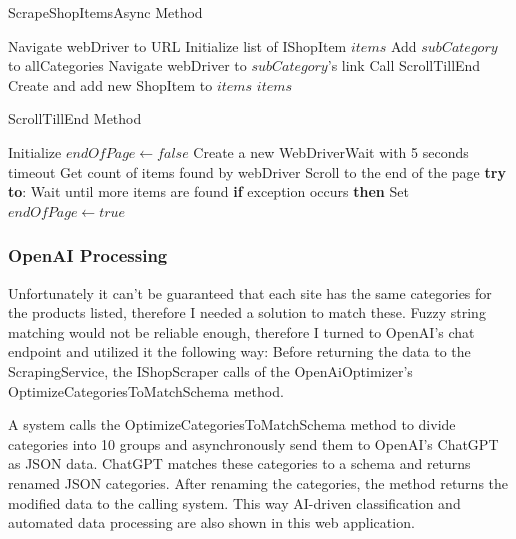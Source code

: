 \begin{algorithm}
	\caption{ScrapeShopItemsAsync Method}
	\begin{algorithmic}
		\State Navigate webDriver to URL
		\State Initialize list of IShopItem $items$
		\State Add $subCategory$ to allCategories
		\State Navigate webDriver to $subCategory$'s link
		\State Call ScrollTillEnd
		\State Create and add new ShopItem to $items$
		\EndFor
		\EndFor
		\EndFor
		\newline
		\Return $items$
	\end{algorithmic}
\end{algorithm}

\begin{algorithm}
	\caption{ScrollTillEnd Method}
	\begin{algorithmic}
		\State Initialize $endOfPage \gets false$
		\State Create a new WebDriverWait with 5 seconds timeout
		\While{not $endOfPage$}
		\State Get count of items found by webDriver
		\State Scroll to the end of the page
		\State \textbf{try to}:
		\State \hspace{\algorithmicindent} Wait until more items are found
		\State \textbf{if} exception occurs \textbf{then}
		\State \hspace{\algorithmicindent} Set $endOfPage \gets true$
		\EndWhile
	\end{algorithmic}
\end{algorithm}

\newpage

\subsubsection{OpenAI Processing}

Unfortunately it can't be guaranteed that each site has the same categories for the products listed, therefore I needed a solution to match these. Fuzzy string matching would not be reliable enough, therefore I turned to OpenAI's chat endpoint and utilized it the following way: Before returning the data to the ScrapingService, the IShopScraper calls of the OpenAiOptimizer's OptimizeCategoriesToMatchSchema method.

A system calls the OptimizeCategoriesToMatchSchema method to divide categories into 10 groups and asynchronously send them to OpenAI's ChatGPT as JSON data. ChatGPT matches these categories to a schema and returns renamed JSON categories. After renaming the categories, the method returns the modified data to the calling system. This way AI-driven classification and automated data processing are also shown in this web application.

